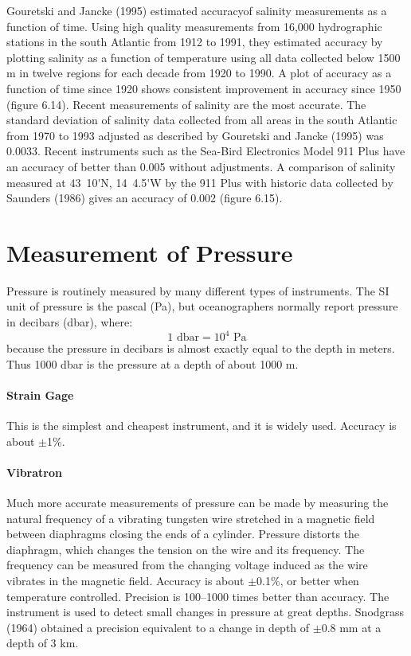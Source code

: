 Gouretski and Jancke (1995) estimated
accuracyof
salinity measurements as a function of time. Using high quality
measurements from 16,000 hydrographic stations in the south Atlantic from 1912 to 1991,
they estimated accuracy by plotting salinity as a function of
temperature using all data collected below 1500 m in twelve regions
for each decade from 1920 to 1990. A plot of accuracy as a function of
time since 1920 shows consistent improvement in accuracy since 1950
(figure 6.14). Recent measurements of salinity are the most
accurate. The standard deviation of salinity data collected from all
areas in the south Atlantic from 1970 to 1993 adjusted as described by
Gouretski and Jancke (1995) was 0.0033. Recent instruments such as the
Sea-Bird Electronics Model 911 Plus have an
accuracy of better than 0.005 without
adjustments. A comparison of salinity measured at 43\degrees\ 10\'{}N,
14\degrees\ 4.5\'{}W by the 911 Plus with historic data collected by
Saunders (1986) gives an accuracy of 0.002 (figure 6.15).

\section{Measurement of Pressure}
Pressure is routinely measured by many
different types of instruments. The SI unit of pressure is the pascal
(Pa), but oceanographers normally report pressure in decibars (dbar),
where:
\begin{equation}
1 \text{ dbar} = 10^4 \text{ Pa}
\end{equation}
because the pressure in decibars is almost exactly equal to the depth
in meters.  Thus 1000 dbar is the pressure at a depth of about 1000 m.

\paragraph{Strain Gage}This is the simplest and
cheapest instrument, and it is widely
used. Accuracy is about $\pm$1\%.

\paragraph{Vibratron} Much more accurate measurements of pressure can be
made by
measuring the natural frequency of a vibrating tungsten wire stretched
in a magnetic field between diaphragms closing the ends of a
cylinder. Pressure distorts the diaphragm, which changes the tension
on the wire and its frequency. The frequency can be measured from the
changing voltage induced as the wire vibrates in the magnetic field.
Accuracy is about $\pm$0.1\%, or better when
temperature controlled. Precision is 100--1000 times better than
accuracy. The instrument is used to detect small changes in pressure
at great depths. Snodgrass (1964) obtained a precision equivalent to a
change in depth of $\pm$0.8 mm at a depth of 3 km.


